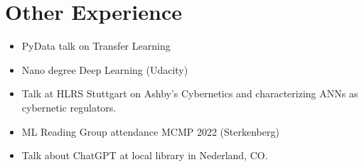\documentclass[11pt, oneside]{article}   	%
\begin{document}
\section{Other Experience}

\begin{multicols}{2}
\begin{itemize}
\item PyData talk on Transfer Learning
\item Nano degree Deep Learning (Udacity)
\item Talk at HLRS Stuttgart on Ashby's Cybernetics and characterizing ANNs as cybernetic regulators.
\item ML Reading Group attendance MCMP 2022 (Sterkenberg)
\item Talk about ChatGPT at local library in Nederland, CO.
\end{itemize}
\end{multicols}



\end{document}
